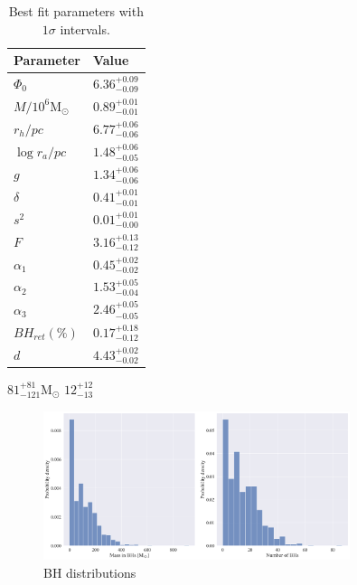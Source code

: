 \begin{table}
	\centering
	\caption{Best fit parameters with $1\sigma$ intervals.}
	\begin{tabular}{l l}

		\hline
		Parameter                 & Value                  \\
		\hline
		$\Phi_0$                  & $6.36^{+0.09}_{-0.09}$ \\
		$M/10^6 \mathrm{M}_\odot$ & $0.89^{+0.01}_{-0.01}$ \\
		$r_h / pc$                & $6.77^{+0.06}_{-0.06}$ \\
		$\log{r_a / pc}$          & $1.48^{+0.06}_{-0.05}$ \\
		$g$                       & $1.34^{+0.06}_{-0.06}$ \\
		$\delta$                  & $0.41^{+0.01}_{-0.01}$ \\
		$s^2$                     & $0.01^{+0.01}_{-0.00}$ \\
		$F$                       & $3.16^{+0.13}_{-0.12}$ \\
		$\alpha_1$                & $0.45^{+0.02}_{-0.02}$ \\
		$\alpha_2$                & $1.53^{+0.05}_{-0.04}$ \\
		$\alpha_3$                & $2.46^{+0.05}_{-0.05}$ \\
		$BH_{ret} (\%)$           & $0.17^{+0.18}_{-0.12}$ \\
		$d$                       & $4.43^{+0.02}_{-0.02}$ \\
		\hline
	\end{tabular}
	\label{tab:parameters_highbin}
\end{table}


$81 ^{+81}_{-121} \mathrm{M}_\odot$
$12^{+12}_{-13}$

\begin{figure}
	\centering
	\includegraphics[width=0.8\textwidth]{figures/high_bin_model/BH_dists.png}
	\caption{BH distributions}
	\label{fig:high_bin_model_BH_dists}
\end{figure}



